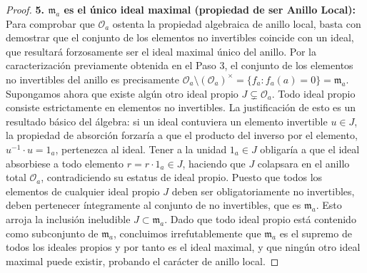 \documentclass[11pt,a4paper]{article}
\theoremstyle{definition}
\theoremstyle{remark}
\numberwithin{equation}{section}
\begin{document}
\begin{proof}
\textbf{5. $\mathfrak{m}_a$ es el único ideal maximal (propiedad de ser Anillo Local):}
Para comprobar que $\mathcal{O}_a$ ostenta la propiedad algebraica de anillo local, basta con demostrar que el conjunto de los elementos no invertibles coincide con un ideal, que resultará forzosamente ser el ideal maximal único del anillo.
Por la caracterización previamente obtenida en el Paso 3, el conjunto de los elementos no invertibles del anillo es precisamente $\mathcal{O}_a \setminus (\mathcal{O}_a)^{\times} = \{ f_a : f_a(a) = 0 \} = \mathfrak{m}_a$.
Supongamos ahora que existe algún otro ideal propio $J \subsetneq \mathcal{O}_a$. Todo ideal propio consiste estrictamente en elementos no invertibles. La justificación de esto es un resultado básico del álgebra: si un ideal contuviera un elemento invertible $u \in J$, la propiedad de absorción forzaría a que el producto del inverso por el elemento, $u^{-1} \cdot u = 1_a$, pertenezca al ideal. Tener a la unidad $1_a \in J$ obligaría a que el ideal absorbiese a todo elemento $r = r \cdot 1_a \in J$, haciendo que $J$ colapsara en el anillo total $\mathcal{O}_a$, contradiciendo su estatus de ideal propio.
Puesto que todos los elementos de cualquier ideal propio $J$ deben ser obligatoriamente no invertibles, deben pertenecer íntegramente al conjunto de no invertibles, que es $\mathfrak{m}_a$. Esto arroja la inclusión ineludible $J \subset \mathfrak{m}_a$.
Dado que todo ideal propio está contenido como subconjunto de $\mathfrak{m}_a$, concluimos irrefutablemente que $\mathfrak{m}_a$ es el supremo de todos los ideales propios y por tanto es el ideal maximal, y que ningún otro ideal maximal puede existir, probando el carácter de anillo local.
\end{proof}
\end{document}
